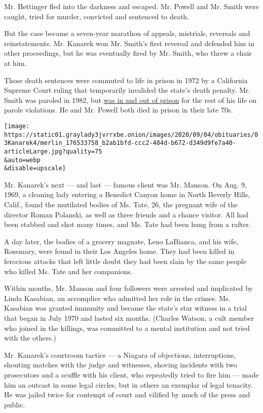 Mr. Hettinger fled into the darkness and escaped. Mr. Powell and Mr.
Smith were caught, tried for murder, convicted and sentenced to death.

But the case became a seven-year marathon of appeals, mistrials,
reversals and reinstatements. Mr. Kanarek won Mr. Smith's first reversal
and defended him in other proceedings, but he was eventually fired by
Mr. Smith, who threw a chair at him.

Those death sentences were commuted to life in prison in 1972 by a
California Supreme Court ruling that temporarily invalided the state's
death penalty. Mr. Smith was paroled in 1982, but
\href{https://www.nytimes3xbfgragh.onion/1987/11/16/us/onion-field-killer-on-parole-is-arrested.html}{was
in and out of prison} for the rest of his life on parole violations. He
and Mr. Powell both died in prison in their late 70s.

\texttt{[image: https://static01.graylady3jvrrxbe.onion/images/2020/09/04/obituaries/03Kanarek4/merlin\_176533758\_b2ab1bfd-ccc2-484d-b672-d349d9fe7a40-articleLarge.jpg?quality=75\\\&auto=webp\\\&disable=upscale]}

Mr. Kanarek's next --- and last --- famous client was Mr. Manson. On
Aug. 9, 1969, a cleaning lady entering a Benedict Canyon home in North
Beverly Hills, Calif., found the mutilated bodies of Ms. Tate, 26, the
pregnant wife of the director Roman Polanski, as well as three friends
and a chance visitor. All had been stabbed and shot many times, and Ms.
Tate had been hung from a rafter.

A day later, the bodies of a grocery magnate, Leno LaBianca, and his
wife, Rosemary, were found in their Los Angeles home. They had been
killed in ferocious attacks that left little doubt they had been slain
by the same people who killed Ms. Tate and her companions.

Within months, Mr. Manson and four followers were arrested and
implicated by Linda Kasabian, an accomplice who admitted her role in the
crimes. Ms. Kasabian was granted immunity and became the state's star
witness in a trial that began in July 1970 and lasted six months.
(Charles Watson, a cult member who joined in the killings, was committed
to a mental institution and not tried with the others.)

Mr. Kanarek's courtroom tactics --- a Niagara of objections,
interruptions, shouting matches with the judge and witnesses, shoving
incidents with two prosecutors and a scuffle with his client, who
repeatedly tried to fire him --- made him an outcast in some legal
circles, but in others an exemplar of legal tenacity. He was jailed
twice for contempt of court and vilified by much of the press and
public.

